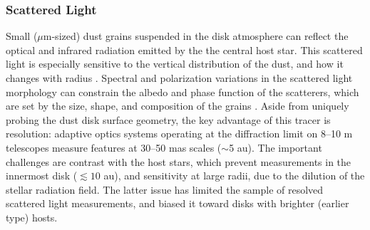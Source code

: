 \documentclass[a4paper]{ar-1col}
\begin{document}
\subsubsection{Scattered Light} \label{sec:primer_scat}
Small ($\mu$m-sized) dust grains suspended in the disk atmosphere can reflect the optical and infrared radiation emitted by the the central host star.  This scattered light is especially sensitive to the vertical distribution of the dust, and how it changes with radius \citep[e.g.,][]{debes13,stolker16,garufi17}.  Spectral and polarization variations in the scattered light morphology can constrain the albedo and phase function of the scatterers, which are set by the size, shape, and composition of the grains \citep{debes08,min12,min16}.  Aside from uniquely probing the dust disk surface geometry, the key advantage of this tracer is resolution: adaptive optics systems operating at the diffraction limit on 8--10 m telescopes measure features at 30--50 mas scales ($\sim$5 au).  The important challenges are contrast with the host stars, which prevent measurements in the innermost disk ($\lesssim 10$ au), and sensitivity at large radii, due to the dilution of the stellar radiation field.  The latter issue has limited the sample of resolved scattered light measurements, and biased it toward disks with brighter (earlier type) hosts.    

\end{document}
